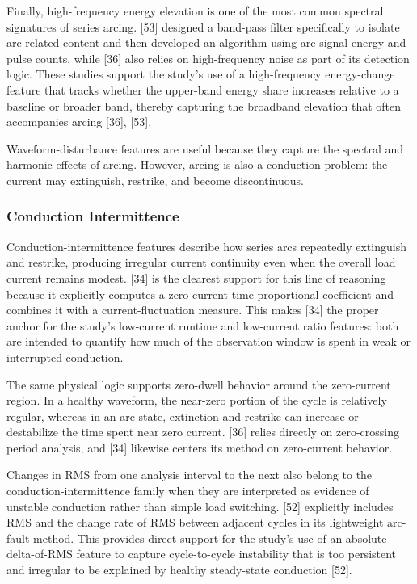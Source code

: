 Finally, high-frequency energy elevation is one of the most common
spectral signatures of series arcing. {[}53{]} designed a band-pass
filter specifically to isolate arc-related content and then developed an
algorithm using arc-signal energy and pulse counts, while {[}36{]} also
relies on high-frequency noise as part of its detection logic. These
studies support the study's use of a high-frequency energy-change
feature that tracks whether the upper-band energy share increases
relative to a baseline or broader band, thereby capturing the broadband
elevation that often accompanies arcing {[}36{]}, {[}53{]}.

Waveform-disturbance features are useful because they capture the
spectral and harmonic effects of arcing. However, arcing is also a
conduction problem: the current may extinguish, restrike, and become
discontinuous.

\subsubsection{Conduction Intermittence}\label{sec:conduction-intermittence}

Conduction-intermittence features describe how series arcs repeatedly
extinguish and restrike, producing irregular current continuity even
when the overall load current remains modest. {[}34{]} is the clearest
support for this line of reasoning because it explicitly computes a
zero-current time-proportional coefficient and combines it with a
current-fluctuation measure. This makes {[}34{]} the proper anchor for
the study's low-current runtime and low-current ratio features: both are
intended to quantify how much of the observation window is spent in weak
or interrupted conduction.

The same physical logic supports zero-dwell behavior around the zero-current
region. In a healthy waveform, the near-zero portion of the cycle is
relatively regular, whereas in an arc state, extinction and restrike can
increase or destabilize the time spent near zero current. {[}36{]} relies
directly on zero-crossing period analysis, and {[}34{]} likewise centers its
method on zero-current behavior.

Changes in RMS from one analysis interval to the next also belong to the
conduction-intermittence family when they are interpreted as evidence of
unstable conduction rather than simple load switching. {[}52{]}
explicitly includes RMS and the change rate of RMS between adjacent
cycles in its lightweight arc-fault method. This provides direct support
for the study's use of an absolute delta-of-RMS feature to capture
cycle-to-cycle instability that is too persistent and irregular to be
explained by healthy steady-state conduction {[}52{]}.

